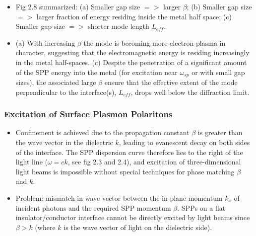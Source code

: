 \begin{itemize}
    \item Fig 2.8 summarized: (a) Smaller gap size $=>$ larger $\beta$; (b) Smaller gap size $=>$ larger fraction of energy residing inside the metal half space; (c) Smaller gap size $=>$ shorter mode length $L_{eff}$.
    
    \item (a) With increasing $\beta$ the mode is becoming more electron-plasma in character, suggesting that the electromagnetic energy is residing increasingly in the metal half-spaces. (c) Despite the penetration of a significant amount of the SPP energy into the metal (for excitation near $\omega_{sp}$ or with small gap sizes), the associated large $\beta$ ensure that the effective extent of the mode perpendicular to the interface(s), $L_{eff}$, drops well below the diffraction limit.
    
\end{itemize}

\subsubsection{Excitation of Surface Plasmon Polaritons}
\begin{itemize}
    \item Confinement is achieved due to the propagation constant $\beta$ is greater than the wave vector in the dielectric $k$, leading to evanescent decay on both sides of the interface. The SPP dispersion curve therefore lies to the right of the light line ($\omega = ck$, see fig 2.3 and 2.4), and excitation of three-dimensional light beams is impossible without special techniques for phase matching $\beta$ and $k$.
    
    \item Problem: mismatch in wave vector between the in-plane momentum $k_x$ of incident photons and the required SPP momentum $\beta$. SPPs on a flat insulator/conductor interface cannot be directly excited by light beams since $\beta>k$ (where $k$ is the wave vector of light on the dielectric side).
\end{itemize}



